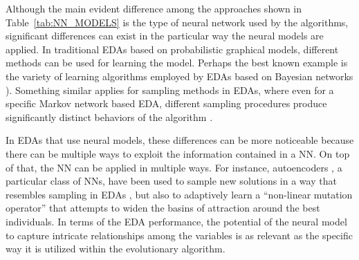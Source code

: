 \documentclass{article} %
\begin{document}
Although the main evident difference among the approaches shown in Table~\ref{tab:NN_MODELS} is the type of neural network used by the algorithms, significant differences can exist in the particular way the neural models are applied. In traditional EDAs based on  probabilistic graphical models, different methods can be used for learning the model. Perhaps the best known example is the variety of learning algorithms employed by EDAs based on Bayesian networks \cite{Etxeberria_and_Larranhaga:1999,Muehlenbein_and_Mahnig:2001a,Pelikan_et_al:1999}).  Something similar applies for sampling methods in EDAs, where even for a specific Markov network based EDA, different sampling procedures produce significantly distinct  behaviors of the algorithm \cite{Santana_et_al:2013b}. 

In EDAs that use neural models, these differences can be more noticeable because there can be multiple ways to exploit the information contained in a NN. On top of that, the NN can be applied in multiple ways. For instance, autoencoders \cite{Bengio:2009,Vincent_et_al:2010}, a particular class of NNs, have been used to sample new solutions in a way that resembles sampling in EDAs  \cite{Probst:2015a}, but also to adaptively learn a ``non-linear mutation operator'' that attempts to  widen the basins of attraction around the best individuals. In terms of the EDA performance,  the potential of the neural model to capture intricate relationships among the variables is as relevant as the specific way it is utilized within the evolutionary algorithm.
\end{document}
